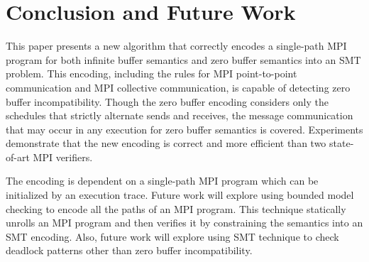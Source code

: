 \section{Conclusion and Future Work}
This paper presents a new algorithm that correctly encodes a single-path MPI program for both infinite buffer semantics and zero buffer semantics into an SMT problem. This encoding, including the rules for MPI point-to-point communication and MPI collective communication, is capable of detecting zero buffer incompatibility. Though the zero buffer encoding considers only the schedules that strictly alternate sends and receives, the message communication that may occur in any execution for zero buffer semantics is covered. Experiments demonstrate that the new encoding is correct and more efficient than two state-of-art MPI verifiers. 

The encoding is dependent on a single-path MPI program which can be initialized by an execution trace. Future work will explore using bounded model checking to encode all the paths of an MPI program. This technique statically unrolls an MPI program and then verifies it by constraining the semantics into an SMT encoding. Also, future work will explore using SMT technique to check deadlock patterns other than zero buffer incompatibility.  
